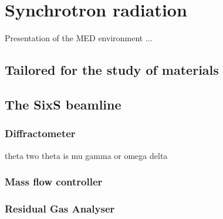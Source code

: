 \section{Synchrotron radiation}

Presentation of the MED environment ... 

\subsection{Tailored for the study of materials}

\subsection{The SixS beamline}

\subsubsection{Diffractometer}
theta two theta is mu gamma or omega delta

\subsubsection{Mass flow controller}

\subsubsection{Residual Gas Analyser}


